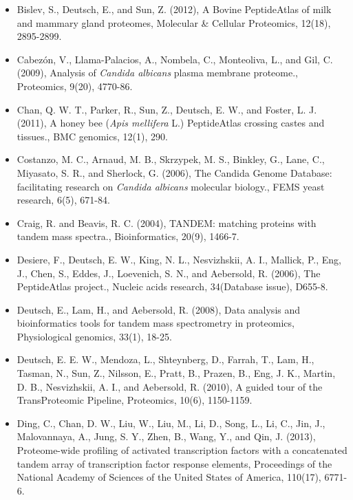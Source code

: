 \begin{itemize}

\item[]{
Bislev, S., Deutsch, E., and Sun, Z. (2012), A Bovine PeptideAtlas of milk and mammary gland
proteomes, Molecular \& Cellular Proteomics, 12(18), 2895-2899.
}

\item[]{
Cabez\'on, V., Llama-Palacios, A., Nombela, C., Monteoliva, L., and Gil, C. (2009), Analysis of
\textit{Candida albicans} plasma membrane proteome., Proteomics, 9(20), 4770-86.
}

\item[]{
Chan, Q. W. T., Parker, R., Sun, Z., Deutsch, E. W., and Foster, L. J. (2011), A honey bee
(\textit{Apis mellifera} L.) PeptideAtlas crossing castes and tissues., BMC genomics, 12(1), 290.
}

\item[]{
Costanzo, M. C., Arnaud, M. B., Skrzypek, M. S., Binkley, G., Lane, C., Miyasato, S. R., and
Sherlock, G. (2006), The Candida Genome Database: facilitating research on 
\textit{Candida albicans} molecular biology., FEMS yeast research, 6(5), 671-84.
}

\item[]{
Craig, R. and Beavis, R. C. (2004), TANDEM: matching proteins with tandem mass spectra.,
Bioinformatics, 20(9), 1466-7.
}

\item[]{
Desiere, F., Deutsch, E. W., King, N. L., Nesvizhskii, A. I., Mallick, P., Eng, J., Chen, S., Eddes,
J., Loevenich, S. N., and Aebersold, R. (2006), The PeptideAtlas project., Nucleic acids
research, 34(Database issue), D655-8.
}

\item[]{
Deutsch, E., Lam, H., and Aebersold, R. (2008), Data analysis and bioinformatics tools for
tandem mass spectrometry in proteomics, Physiological genomics, 33(1), 18-25.
}

\item[]{
Deutsch, E. E. W., Mendoza, L., Shteynberg, D., Farrah, T., Lam, H., Tasman, N., Sun, Z.,
Nilsson, E., Pratt, B., Prazen, B., Eng, J. K., Martin, D. B., Nesvizhskii, A. I., and Aebersold,
R. (2010), A guided tour of the TransProteomic Pipeline, Proteomics, 10(6), 1150-1159.
}

\item[]{
Ding, C., Chan, D. W., Liu, W., Liu, M., Li, D., Song, L., Li, C., Jin, J., Malovannaya, A., Jung,
S. Y., Zhen, B., Wang, Y., and Qin, J. (2013), Proteome-wide profiling of activated 
transcription factors with a concatenated tandem array of transcription factor response elements,
Proceedings of the National Academy of Sciences of the United States of America, 110(17),
6771-6.
}


\end{itemize}

